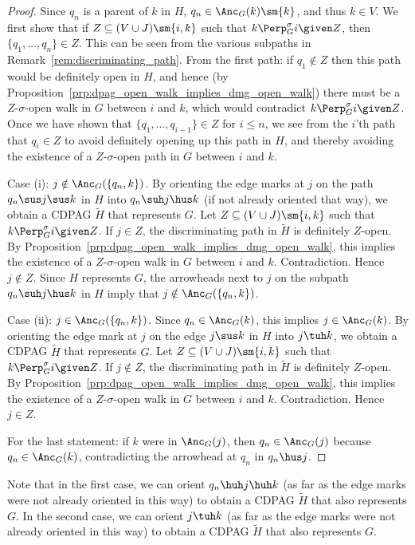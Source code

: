 \begin{proof}
  Since $q_n$ is a parent of $k$ in $H$, $q_n \in \Anc_G(k) \sm \{k\}$, and thus $k \in V$.
  We first show that if $Z \subseteq (V \cup J) \sm \{i,k\}$ such that $k \Perp^\sigma_G i \given Z$, then $\{q_1, \dots, q_n\} \in Z$.
  This can be seen from the various subpaths in Remark~\ref{rem:discriminating_path}.
  From the first path: if $q_1 \notin Z$ then this path would be definitely open in $H$, and hence (by Proposition~\ref{prp:dpag_open_walk_implies_dmg_open_walk}) there must be a $Z$-$\sigma$-open walk in $G$ between $i$ and $k$, which would contradict $k \Perp^\sigma_G i \given Z$.
  Once we have shown that $\{q_1, \dots, q_{i-1}\} \in Z$ for $i \le n$, we see from the $i$'th path that $q_i \in Z$ to avoid definitely opening up this path in $H$, and thereby avoiding the existence of a $Z$-$\sigma$-open path in $G$ between $i$ and $k$.

  Case (i): $j \notin \Anc_G(\{q_n,k\})$.
  By orienting the edge marks at $j$ on the path $q_n \sus j \sus k$ in $H$ into $q_n \suh j \hus k$ (if not already oriented that way), we obtain a CDPAG $\tilde{H}$ that represents $G$.
  Let $Z \subseteq (V \cup J) \sm \{i,k\}$ such that $k \Perp^\sigma_G i \given Z$. 
  If $j \in Z$, the discriminating path in $\tilde{H}$ is definitely $Z$-open.
  By Proposition~\ref{prp:dpag_open_walk_implies_dmg_open_walk}, this implies the existence of a $Z$-$\sigma$-open walk in $G$ between $i$ and $k$.
  Contradiction. 
  Hence $j \notin Z$.
  Since $H$ represents $G$, the arrowheads next to $j$ on the subpath $q_n \suh j \hus k$ in $H$ imply that $j \notin \Anc_G(\{q_n,k\})$.

  Case (ii): $j \in \Anc_G(\{q_n,k\})$. 
  Since $q_n \in \Anc_G(k)$, this implies $j \in \Anc_G(k)$.
  By orienting the edge mark at $j$ on the edge $j \sus k$ in $H$ into $j \tuh k$, we obtain a CDPAG $\tilde{H}$ that represents $G$.
  Let $Z \subseteq (V \cup J) \sm \{i,k\}$ such that $k \Perp^\sigma_G i \given Z$. 
  If $j \notin Z$, the discriminating path in $\tilde{H}$ is definitely $Z$-open.
  By Proposition~\ref{prp:dpag_open_walk_implies_dmg_open_walk}, this implies the existence of a $Z$-$\sigma$-open walk in $G$ between $i$ and $k$.
  Contradiction. 
  Hence $j \in Z$.

  For the last statement: if $k$ were in $\Anc_G(j)$, then $q_n \in \Anc_G(j)$ because $q_n \in \Anc_G(k)$, contradicting the arrowhead at $q_n$ in $q_n \hus j$.
\end{proof}
Note that in the first case, we can orient $q_n \huh j \huh k$ (as far as the edge marks were not already oriented in this way) to obtain a CDPAG $\tilde{H}$ that also represents $G$. 
In the second case, we can orient $j \tuh k$ (as far as the edge marks were not already oriented in this way) to obtain a CDPAG $\tilde{H}$ that also represents $G$.

